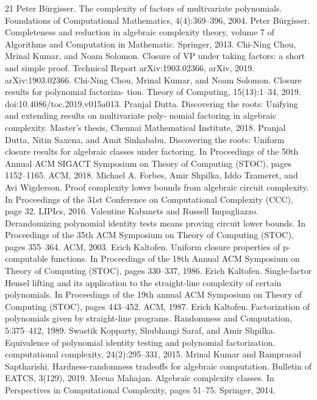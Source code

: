 \documentclass[10pt,a4paper]{article}
\begin{document}
\begin{thebibliography}{21}
Peter Bürgisser. The complexity of factors of multivariate polynomials. Foundations of Computational Mathematics, 4(4):369–396, 2004.
Peter Bürgisser. Completeness and reduction in algebraic complexity theory, volume 7 of Algorithms and Computation in Mathematic. Springer, 2013.
Chi-Ning Chou, Mrinal Kumar, and Noam Solomon. Closure of VP under taking factors: a short and simple proof. Technical Report arXiv:1903.02366, arXiv, 2019. arXiv:1903.02366.
Chi-Ning Chou, Mrinal Kumar, and Noam Solomon. Closure results for polynomial factoriza- tion. Theory of Computing, 15(13):1–34, 2019. doi:10.4086/toc.2019.v015a013.
Pranjal Dutta. Discovering the roots: Unifying and extending results on multivariate poly- nomial factoring in algebraic complexity. Master’s thesis, Chennai Mathematical Institute, 2018.
Pranjal Dutta, Nitin Saxena, and Amit Sinhababu. Discovering the roots: Uniform closure results for algebraic classes under factoring. In Proceedings of the 50th Annual ACM SIGACT Symposium on Theory of Computing (STOC), pages 1152–1165. ACM, 2018.
Michael A. Forbes, Amir Shpilka, Iddo Tzameret, and Avi Wigderson. Proof complexity lower bounds from algebraic circuit complexity. In Proceedings of the 31st Conference on Computational Complexity (CCC), page 32. LIPIcs, 2016.
Valentine Kabanets and Russell Impagliazzo. Derandomizing polynomial identity tests means proving circuit lower bounds. In Proceedings of the 35th ACM Symposium on Theory of Computing (STOC), pages 355–364. ACM, 2003.
Erich Kaltofen. Uniform closure properties of p-computable functions. In Proceedings of the 18th Annual ACM Symposium on Theory of Computing (STOC), pages 330–337, 1986.
Erich Kaltofen. Single-factor Hensel lifting and its application to the straight-line complexity of certain polynomials. In Proceedings of the 19th annual ACM Symposium on Theory of Computing (STOC), pages 443–452. ACM, 1987.
Erich Kaltofen. Factorization of polynomials given by straight-line programs. Randomness and Computation, 5:375–412, 1989.
Swastik Kopparty, Shubhangi Saraf, and Amir Shpilka. Equivalence of polynomial identity testing and polynomial factorization. computational complexity, 24(2):295–331, 2015.
Mrinal Kumar and Ramprasad Saptharishi. Hardness-randomness tradeoffs for algebraic computation. Bulletin of EATCS, 3(129), 2019.
Meena Mahajan. Algebraic complexity classes. In Perspectives in Computational Complexity, pages 51–75. Springer, 2014.

\end{thebibliography}
\end{document}
